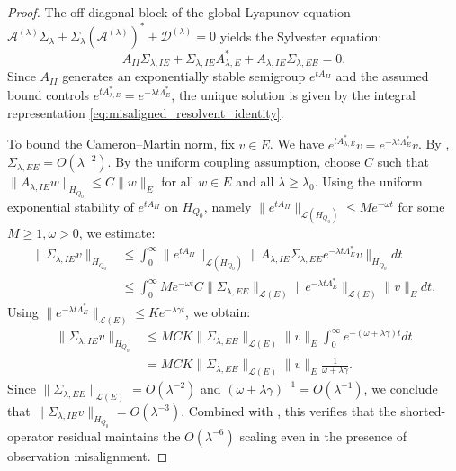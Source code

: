 \begin{proof}
  The off-diagonal block of the global Lyapunov equation $\mathcal{A}^{(\lambda)} \Sigma_\lambda + \Sigma_\lambda (\mathcal{A}^{(\lambda)})^* + \mathcal{D}^{(\lambda)} = 0$ yields the Sylvester equation:
  \[
    A_{II} \Sigma_{\lambda,IE} + \Sigma_{\lambda,IE} A_{\lambda,E}^* + A_{\lambda,IE} \Sigma_{\lambda,EE} = 0.
  \]
  Since $A_{II}$ generates an exponentially stable semigroup $e^{t A_{II}}$ and the assumed bound controls $e^{tA_{\lambda,E}^*}=e^{-\lambda t\Lambda_E^*}$, the unique solution is given by the integral representation \eqref{eq:misaligned_resolvent_identity}.

  To bound the Cameron--Martin norm, fix $v \in E$. We have $e^{t A_{\lambda,E}^*} v = e^{-\lambda t \Lambda_E^*} v$. By , $\Sigma_{\lambda,EE} = O(\lambda^{-2})$. By the uniform coupling assumption, choose $C$ such that $\|A_{\lambda,IE} w\|_{H_{Q_0}} \le C \|w\|_E$ for all $w \in E$ and all $\lambda\ge\lambda_0$. Using the uniform exponential stability of $e^{t A_{II}}$ on $H_{Q_0}$, namely $\|e^{t A_{II}}\|_{\mathcal{L}(H_{Q_0})} \le M e^{-\omega t}$ for some $M \ge 1, \omega > 0$, we estimate:
  \begin{align*}
    \|\Sigma_{\lambda,IE} v\|_{H_{Q_0}}
    &\le \int_0^\infty \|e^{t A_{II}}\|_{\mathcal{L}(H_{Q_0})} \|A_{\lambda,IE} \Sigma_{\lambda,EE} e^{-\lambda t \Lambda_E^*} v\|_{H_{Q_0}} dt \\
    &\le \int_0^\infty M e^{-\omega t} C \|\Sigma_{\lambda,EE}\|_{\mathcal{L}(E)} \|e^{-\lambda t \Lambda_E^*}\|_{\mathcal{L}(E)} \|v\|_E dt.
  \end{align*}
  Using $\|e^{-\lambda t\Lambda_E^*}\|_{\mathcal{L}(E)} \le K e^{-\lambda\gamma t}$, we obtain:
  \begin{align*}
    \|\Sigma_{\lambda,IE} v\|_{H_{Q_0}}
    &\le M C K \|\Sigma_{\lambda,EE}\|_{\mathcal{L}(E)} \|v\|_E \int_0^\infty e^{-(\omega + \lambda \gamma) t} dt \\
    &= M C K \|\Sigma_{\lambda,EE}\|_{\mathcal{L}(E)} \|v\|_E \frac{1}{\omega + \lambda \gamma}.
  \end{align*}
  Since $\|\Sigma_{\lambda,EE}\|_{\mathcal{L}(E)} = O(\lambda^{-2})$ and $(\omega + \lambda \gamma)^{-1} = O(\lambda^{-1})$, we conclude that $\|\Sigma_{\lambda,IE} v\|_{H_{Q_0}} = O(\lambda^{-3})$. Combined with , this verifies that the shorted-operator residual maintains the $O(\lambda^{-6})$ scaling even in the presence of observation misalignment.
\end{proof}

